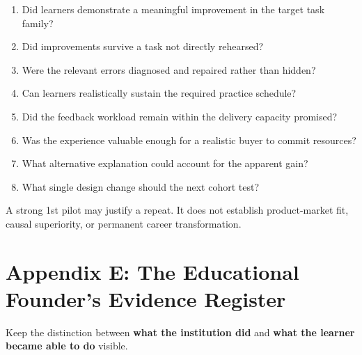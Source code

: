 \begin{enumerate}
    \item Did learners demonstrate a meaningful improvement in the target task family?
    \item Did improvements survive a task not directly rehearsed?
    \item Were the relevant errors diagnosed and repaired rather than hidden?
    \item Can learners realistically sustain the required practice schedule?
    \item Did the feedback workload remain within the delivery capacity promised?
    \item Was the experience valuable enough for a realistic buyer to commit resources?
    \item What alternative explanation could account for the apparent gain?
    \item What single design change should the next cohort test?
\end{enumerate}

A strong 1st pilot may justify a repeat. It does not establish product-market fit, causal superiority, or permanent career transformation.

\section*{Appendix E: The Educational Founder's Evidence Register}

Keep the distinction between \textbf{what the institution did} and \textbf{what the learner became able to do} visible.

